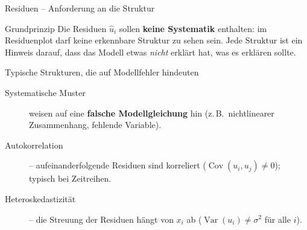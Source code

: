 \documentclass[aspectratio=169,11pt]{beamer}
\begin{document}
\begin{frame}{Residuen -- Anforderung an die Struktur}
  \begin{block}{Grundprinzip}
    Die Residuen $\hat{u}_i$ sollen \textbf{keine Systematik} enthalten:
    im Residuenplot darf keine erkennbare Struktur zu sehen sein.
    Jede Struktur ist ein Hinweis darauf, dass das Modell etwas
    \emph{nicht} erklärt hat, was es erklären sollte.
  \end{block}

  \begin{alertblock}{Typische Strukturen, die auf Modellfehler hindeuten}
    \begin{description}
      \item[Systematische Muster] weisen auf eine \textbf{falsche
            Modellgleichung} hin (z.\,B.\ nichtlinearer Zusammenhang,
            fehlende Variable).
      \item[Autokorrelation] -- aufeinanderfolgende Residuen sind
            korreliert ($\operatorname{Cov}(u_i,u_j) \ne 0$); typisch
            bei Zeitreihen.
      \item[Heteroskedastizität] -- die Streuung der Residuen hängt
            von $x_i$ ab ($\operatorname{Var}(u_i) \ne \sigma^2$
            für alle $i$).
    \end{description}
  \end{alertblock}
\end{frame}
\end{document}
